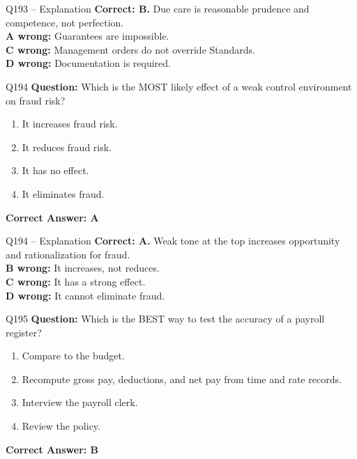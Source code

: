 \documentclass[aspectratio=169,10pt]{beamer}
\begin{document}
	\begin{frame}[t]{Q193 -- Explanation}
		\small
		\textbf{Correct: B.} Due care is reasonable prudence and competence, not perfection. \\[4pt]
		\textbf{A wrong:} Guarantees are impossible. \\[2pt]
		\textbf{C wrong:} Management orders do not override Standards. \\[2pt]
		\textbf{D wrong:} Documentation is required.
	\end{frame}
	
	\begin{frame}[t]{Q194}
		\small
		\textbf{Question:} Which is the MOST likely effect of a weak control environment on fraud risk?
		\begin{enumerate}[label=\Alph*.,itemsep=1pt,topsep=2pt]
			\item It increases fraud risk.
			\item It reduces fraud risk.
			\item It has no effect.
			\item It eliminates fraud.
		\end{enumerate}
		\vspace{4pt}
		\textbf{Correct Answer: A}
	\end{frame}
	
	\begin{frame}[t]{Q194 -- Explanation}
		\small
		\textbf{Correct: A.} Weak tone at the top increases opportunity and rationalization for fraud. \\[4pt]
		\textbf{B wrong:} It increases, not reduces. \\[2pt]
		\textbf{C wrong:} It has a strong effect. \\[2pt]
		\textbf{D wrong:} It cannot eliminate fraud.
	\end{frame}
	
	\begin{frame}[t]{Q195}
		\small
		\textbf{Question:} Which is the BEST way to test the accuracy of a payroll register?
		\begin{enumerate}[label=\Alph*.,itemsep=1pt,topsep=2pt]
			\item Compare to the budget.
			\item Recompute gross pay, deductions, and net pay from time and rate records.
			\item Interview the payroll clerk.
			\item Review the policy.
		\end{enumerate}
		\vspace{4pt}
		\textbf{Correct Answer: B}
	\end{frame}
	
\end{document}
